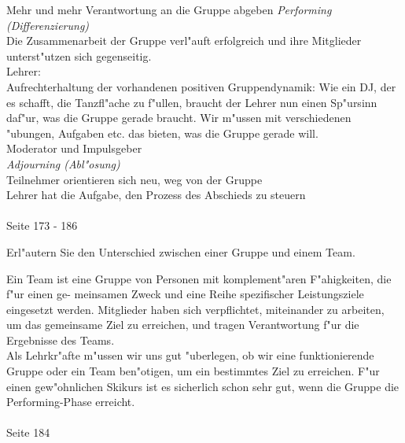 \begin{solution}
Mehr und mehr Verantwortung an die Gruppe abgeben 
\emph{Performing (Differenzierung)}\\
Die Zusammenarbeit der Gruppe verl"auft erfolgreich und ihre Mitglieder unterst"utzen sich gegenseitig.\\
Lehrer:\\
Aufrechterhaltung der vorhandenen positiven Gruppendynamik: Wie ein DJ, der es schafft, die Tanzfl"ache zu f"ullen, braucht der Lehrer nun einen Sp"ursinn daf"ur, was die Gruppe gerade braucht. Wir m"ussen mit verschiedenen "ubungen, Aufgaben etc. das bieten, was die Gruppe gerade will.\\
Moderator und Impulsgeber\\
\emph{Adjourning (Abl"osung)}\\
Teilnehmer orientieren sich neu, weg von der Gruppe\\
Lehrer hat die Aufgabe, den Prozess des Abschieds zu steuern\\\\
 Seite 173 - 186
\end{solution}

\begin{question}{6}
Erl"autern Sie den Unterschied zwischen einer Gruppe und einem Team.
\end{question}
\begin{solution}
Ein Team ist eine Gruppe von Personen mit komplement"aren F"ahigkeiten, die f"ur einen ge- meinsamen Zweck und eine Reihe spezifischer Leistungsziele eingesetzt werden. Mitglieder haben sich verpflichtet, miteinander zu arbeiten, um das gemeinsame Ziel zu erreichen, und tragen Verantwortung f"ur die Ergebnisse des Teams.\\
Als Lehrkr"afte m"ussen wir uns gut "uberlegen, ob wir eine funktionierende Gruppe oder ein Team ben"otigen, um ein bestimmtes Ziel zu erreichen. F"ur einen gew"ohnlichen Skikurs ist es sicherlich schon sehr gut, wenn die Gruppe die Performing-Phase erreicht.\\\\
 Seite 184
\end{solution}

